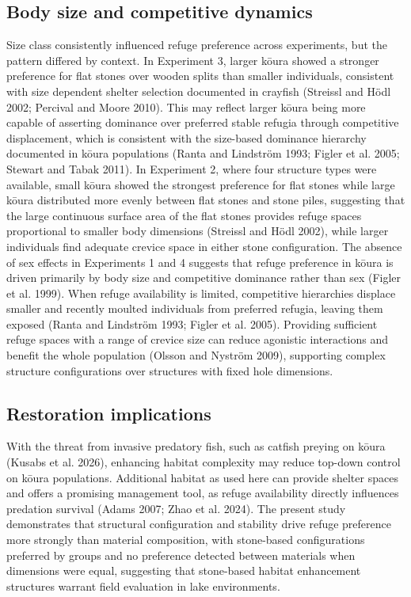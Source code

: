 \documentclass[
  12pt,
  a4paper,
  oneside]{scrbook}
\begin{document}
\subsection{Body size and competitive
dynamics}\label{body-size-and-competitive-dynamics}

Size class consistently influenced refuge preference across experiments,
but the pattern differed by context. In Experiment 3, larger kōura
showed a stronger preference for flat stones over wooden splits than
smaller individuals, consistent with size dependent shelter selection
documented in crayfish (Streissl and Hödl 2002; Percival and Moore
2010). This may reflect larger kōura being more capable of asserting
dominance over preferred stable refugia through competitive
displacement, which is consistent with the size-based dominance
hierarchy documented in kōura populations (Ranta and Lindström 1993;
Figler et al. 2005; Stewart and Tabak 2011). In Experiment 2, where four
structure types were available, small kōura showed the strongest
preference for flat stones while large kōura distributed more evenly
between flat stones and stone piles, suggesting that the large
continuous surface area of the flat stones provides refuge spaces
proportional to smaller body dimensions (Streissl and Hödl 2002), while
larger individuals find adequate crevice space in either stone
configuration. The absence of sex effects in Experiments 1 and 4
suggests that refuge preference in kōura is driven primarily by body
size and competitive dominance rather than sex (Figler et al. 1999).
When refuge availability is limited, competitive hierarchies displace
smaller and recently moulted individuals from preferred refugia, leaving
them exposed (Ranta and Lindström 1993; Figler et al. 2005). Providing
sufficient refuge spaces with a range of crevice size can reduce
agonistic interactions and benefit the whole population (Olsson and
Nyström 2009), supporting complex structure configurations over
structures with fixed hole dimensions.

\subsection{Restoration implications}\label{restoration-implications}

With the threat from invasive predatory fish, such as catfish preying on
kōura (Kusabs et al. 2026), enhancing habitat complexity may reduce
top-down control on kōura populations. Additional habitat as used here
can provide shelter spaces and offers a promising management tool, as
refuge availability directly influences predation survival (Adams 2007;
Zhao et al. 2024). The present study demonstrates that structural
configuration and stability drive refuge preference more strongly than
material composition, with stone-based configurations preferred by
groups and no preference detected between materials when dimensions were
equal, suggesting that stone-based habitat enhancement structures
warrant field evaluation in lake environments.
\end{document}

